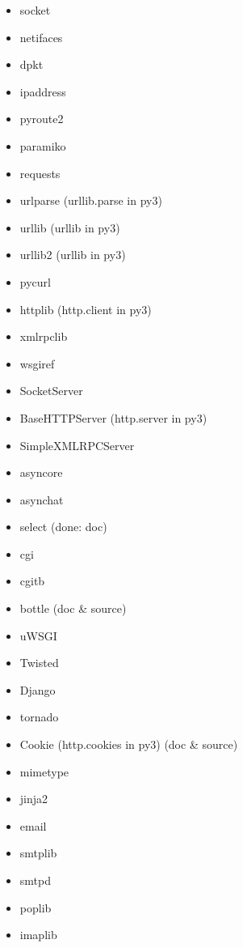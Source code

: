 \documentclass{article}
\begin{document}
\begin{enumerate}
\begin{itemize}
            \item socket
            \item netifaces
            \item dpkt
            \item ipaddress
            \item pyroute2
            \item paramiko
            \item requests
            \item urlparse (urllib.parse in py3)
            \item urllib (urllib in py3)
            \item urllib2 (urllib in py3)
            \item pycurl
            \item httplib (http.client in py3)
            \item xmlrpclib
            \item wsgiref
            \item SocketServer
            \item BaseHTTPServer (http.server in py3)
            \item SimpleXMLRPCServer
            \item asyncore
            \item asynchat
            \item select (done: doc)
            \item cgi
            \item cgitb
            \item bottle (doc & source)
            \item uWSGI
            \item Twisted
            \item Django
            \item tornado
            \item Cookie (http.cookies in py3) (doc & source)

            \item mimetype

            \item jinja2

            \item email
            \item smtplib
            \item smtpd
            \item poplib
            \item imaplib


\end{itemize}
\end{enumerate}
\end{document}
